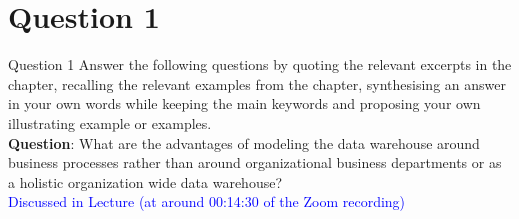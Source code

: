 \section*{Question 1}

\begin{frame}[fragile]{Question 1}
Answer the following questions by quoting the relevant excerpts in the chapter, recalling the relevant examples from the chapter, synthesising an answer in your own words while keeping the main keywords and proposing your own illustrating example or examples.\\\vspace{10pt}
\textbf{Question}: What are the advantages of modeling the data warehouse around business processes rather than around organizational business departments or as a holistic organization wide data warehouse?\\
\vspace{10pt}
\textcolor{blue}{Discussed in Lecture (at around 00:14:30 of the Zoom recording)}
\end{frame}

